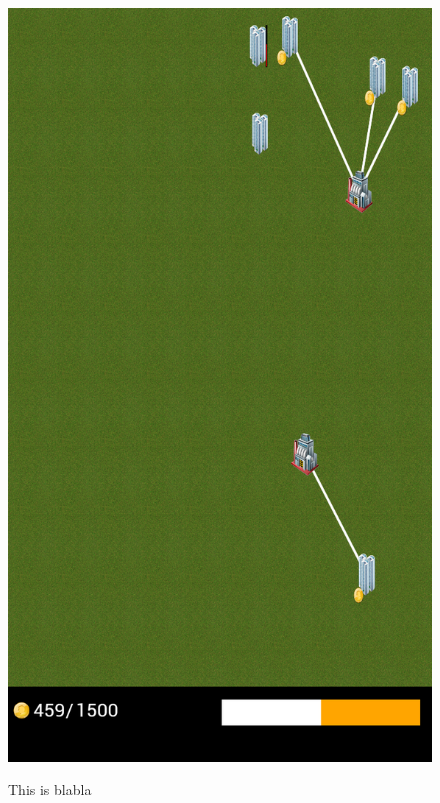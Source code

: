 \begin{figure}[H]
{		\includegraphics[scale=0.17]{pictures/sprint2-screen/sprint2-9}
	}
	\caption{This is blabla}
	\end{figure}

